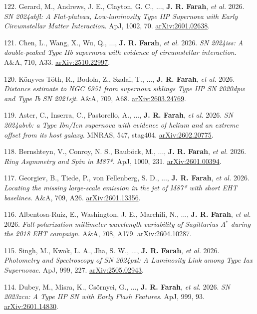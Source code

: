 \documentclass[margin,line]{res}
\newcommand{\apj}{ApJ}                    %
\newcommand{\aap}{A\&A}                   %
\newcommand{\mnras}{MNRAS}                %
\begin{document}
\begin{resume}
122. Gerard, M., Andrews, J. E., Clayton, G. C., ..., \textbf{J. R. Farah}, \textit{et al.} 2026. \textit{SN 2024abfl: A Flat-plateau, Low-luminosity Type IIP Supernova with Early Circumstellar Matter Interaction}. \apj, 1002, 70. \href{https://arxiv.org/abs/2601.02638}{arXiv:2601.02638}.

121. Chen, L., Wang, X., Wu, Q., ..., \textbf{J. R. Farah}, \textit{et al.} 2026. \textit{SN 2024iss: A double-peaked Type IIb supernova with evidence of circumstellar interaction}. \aap, 710, A33. \href{https://arxiv.org/abs/2510.22997}{arXiv:2510.22997}.

120. K{\"o}nyves-T{\'o}th, R., Bodola, Z., Szalai, T., ..., \textbf{J. R. Farah}, \textit{et al.} 2026. \textit{Distance estimate to NGC 6951 from supernova siblings Type IIP SN 2020dpw and Type Ib SN 2021sjt}. \aap, 709, A68. \href{https://arxiv.org/abs/2603.24769}{arXiv:2603.24769}.

119. Aster, C., Inserra, C., Pastorello, A., ..., \textbf{J. R. Farah}, \textit{et al.} 2026. \textit{SN 2024abvb: a Type Ibn/Icn supernova with evidence of helium and an extreme offset from its host galaxy}. \mnras, 547, stag404. \href{https://arxiv.org/abs/2602.20775}{arXiv:2602.20775}.

118. Bernshteyn, V., Conroy, N. S., Baub{\"o}ck, M., ..., \textbf{J. R. Farah}, \textit{et al.} 2026. \textit{Ring Asymmetry and Spin in M87*}. \apj, 1000, 231. \href{https://arxiv.org/abs/2601.00394}{arXiv:2601.00394}.

117. Georgiev, B., Tiede, P., von Fellenberg, S. D., ..., \textbf{J. R. Farah}, \textit{et al.} 2026. \textit{Locating the missing large-scale emission in the jet of M87* with short EHT baselines}. \aap, 709, A26. \href{https://arxiv.org/abs/2601.13356}{arXiv:2601.13356}.

116. Albentosa-Ruiz, E., Washington, J. E., Marchili, N., ..., \textbf{J. R. Farah}, \textit{et al.} 2026. \textit{Full-polarization millimeter wavelength variability of Sagittarius A$^{*}$ during the 2018 EHT campaign}. \aap, 708, A179. \href{https://arxiv.org/abs/2604.10287}{arXiv:2604.10287}.

115. Singh, M., Kwok, L. A., Jha, S. W., ..., \textbf{J. R. Farah}, \textit{et al.} 2026. \textit{Photometry and Spectroscopy of SN 2024pxl: A Luminosity Link among Type Iax Supernovae}. \apj, 999, 227. \href{https://arxiv.org/abs/2505.02943}{arXiv:2505.02943}.

114. Dubey, M., Misra, K., Cs{\"o}rnyei, G., ..., \textbf{J. R. Farah}, \textit{et al.} 2026. \textit{SN 2023zcu: A Type IIP SN with Early Flash Features}. \apj, 999, 93. \href{https://arxiv.org/abs/2601.14830}{arXiv:2601.14830}.


\end{resume}
\end{document}
